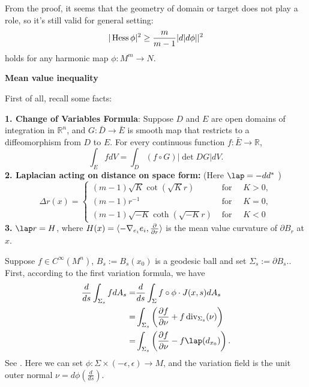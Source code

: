 \documentclass[a4paper,12pt]{article}
\begin{document}
\begin{remark}
    From the proof, it seems that the geometry of domain or target does not play a role, so it's still valid for general setting: 
$$ |\operatorname{Hess} \phi |^2 \geq \frac{m}{m-1}|d|d \phi ||^2 $$
holds for any harmonic map $\phi :M^m \to N$.
\end{remark}


\np  \textbf{Mean value inequality}

First of all, recall some facts:
\begin{remark}
    \textbf{1. Change of Variables Formula}: Suppose $D$ and $E$ are open domains of integration in $\mathbb{R}^n$, and $G: \bar{D} \rightarrow \bar{E}$ is smooth map that restricts to a diffeomorphism from $D$ to $E$. For every continuous function $f: \bar{E} \rightarrow \mathbb{R}$,
    \begin{equation}
        \int_E f d V=\int_D(f \circ G)|\operatorname{det} D G| d V.
    \end{equation}
\textbf{2. Laplacian acting on distance on space form:} (Here $\lap = -d d^{*}$ )
\begin{equation}
    \Delta r(x) =\left\{\begin{aligned}
(m-1) \sqrt{K} \cot (\sqrt{K} r) & \text { for } \quad K>0, \\
(m-1) r^{-1} & \text { for } \quad K=0, \\
(m-1) \sqrt{-K} \operatorname{coth}(\sqrt{-K} r) & \text { for } \quad K<0
\end{aligned}\right.
\end{equation}
\textbf{3.} $\lap r = H$, where $H(x)= \langle -\nabla _{e_i}e_{i}, \frac{\partial }{\partial r} \rangle$ is the mean value curvature of $\partial B_r$ at $x$.    
\end{remark}

Suppose $f \in C^{\infty }(M^n)$,   $B_{s}:=B_{s}(x_0)$  is a geodesic ball and set $\Sigma _s:= \partial B_s$.. First, according to the first variation formula, we have 
$$ \begin{aligned}
  \frac{d}{ds} \int_{\Sigma _{s}}^{} f dA_s=& \frac{d}{ds} \int_{\Sigma }^{} f \circ \phi \cdot  J(x,s) dA_s   \\
  =&  \int_{\Sigma _{s}}^{} \left( \frac{\partial f}{\partial \nu }+f \di_{\Sigma _s}(\nu ) \right)\\
  =&  \int_{\Sigma _{s}}^{} \left( \frac{\partial f}{\partial \nu }-f \lap (d_{x_0}) \right). \\
\end{aligned}  $$
See \cite{Li2012Geometric}. Here we can set $\phi : \Sigma \times (-\epsilon ,\epsilon ) \to M$, and the variation field is the unit outer normal $\nu = d \phi (\frac{d}{ds} )$.   
\end{document}
